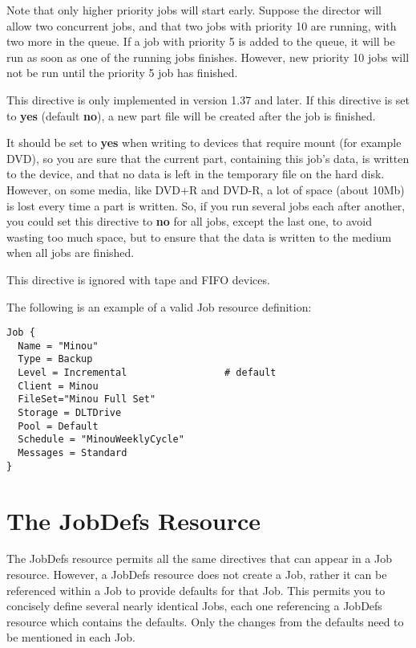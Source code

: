\begin{description}
   Note that only higher priority jobs will start early.  Suppose the
   director will allow two concurrent jobs, and that two jobs with
   priority 10 are running, with two more in the queue.  If a job with
   priority 5 is added to the queue, it will be run as soon as one of
   the running jobs finishes.  However, new priority 10 jobs will not
   be run until the priority 5 job has finished.

\label{WritePartAfterJob}
\item [Write Part After Job = \lt{}yes\vb{}no\gt{}]
   This directive is only implemented in version 1.37 and later.
   If this directive is set to {\bf yes} (default {\bf no}), a new part file
   will be created after the job is finished.  

   It should be set to {\bf yes} when writing to devices that require mount
   (for example DVD), so you are sure that the current part, containing
   this job's data, is written to the device, and that no data is left in
   the temporary file on the hard disk.  However, on some media, like DVD+R
   and DVD-R, a lot of space (about 10Mb) is lost every time a part is
   written.  So, if you run several jobs each after another, you could set
   this directive to {\bf no} for all jobs, except the last one, to avoid
   wasting too much space, but to ensure that the data is written to the
   medium when all jobs are finished.

   This directive is ignored with tape and FIFO devices.  

\end{description}

The following is an example of a valid Job resource definition: 

\footnotesize
\begin{verbatim}
Job {
  Name = "Minou"
  Type = Backup
  Level = Incremental                 # default
  Client = Minou
  FileSet="Minou Full Set"
  Storage = DLTDrive
  Pool = Default
  Schedule = "MinouWeeklyCycle"
  Messages = Standard
}
\end{verbatim}
\normalsize

\section{The JobDefs Resource}
\label{JobDefsResource}

The JobDefs resource permits all the same directives that can appear in a Job
resource. However, a JobDefs resource does not create a Job, rather it can be
referenced within a Job to provide defaults for that Job. This permits you to
concisely define several nearly identical Jobs, each one referencing a JobDefs
resource which contains the defaults. Only the changes from the defaults need to
be mentioned in each Job. 


